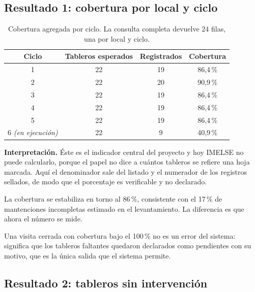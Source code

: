 \documentclass[10pt,letterpaper]{article}
\begin{document}
\subsection{Resultado 1: cobertura por local y ciclo}

\begin{table}[H]
\centering
\small
\begin{tabular}{@{}cccc@{}}
\toprule
\textbf{Ciclo} & \textbf{Tableros esperados} & \textbf{Registrados} & \textbf{Cobertura} \\
\midrule
1 & 22 & 19 & 86,4\,\% \\
2 & 22 & 20 & 90,9\,\% \\
3 & 22 & 19 & 86,4\,\% \\
4 & 22 & 19 & 86,4\,\% \\
5 & 22 & 19 & 86,4\,\% \\
6 \emph{(en ejecución)} & 22 & 9 & 40,9\,\% \\
\bottomrule
\end{tabular}
\caption{Cobertura agregada por ciclo. La consulta completa devuelve 24 filas,
una por local y ciclo.}
\end{table}

\textbf{Interpretación.} Éste es el indicador central del proyecto y hoy IMELSE
no puede calcularlo, porque el papel no dice a cuántos tableros se refiere una
hoja marcada. Aquí el denominador sale del listado y el numerador de los
registros sellados, de modo que el porcentaje es verificable y no declarado.

La cobertura se estabiliza en torno al 86\,\%, consistente con el 17\,\% de
mantenciones incompletas estimado en el levantamiento. La diferencia es que
ahora el número se mide.

Una visita cerrada con cobertura bajo el 100\,\% no es un error del sistema:
significa que los tableros faltantes quedaron declarados como pendientes con su
motivo, que es la única salida que el sistema permite.

\subsection{Resultado 2: tableros sin intervención}
\end{document}
